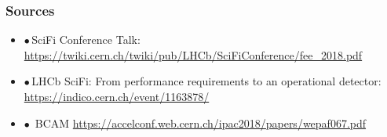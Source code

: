 \documentclass[aspectratio=1610, 12pt]{beamer}
\begin{document}
\begin{frame}\frametitle{Sources}
  \begin{itemize}
    \item $\bullet$\,SciFi Conference Talk: \url{https://twiki.cern.ch/twiki/pub/LHCb/SciFiConference/fee_2018.pdf}
    \item $\bullet$\,LHCb SciFi: From performance requirements to an operational detector: \url{https://indico.cern.ch/event/1163878/}
    \item $\bullet$\, BCAM \url{https://accelconf.web.cern.ch/ipac2018/papers/wepaf067.pdf}
  \end{itemize}
\end{frame}
\end{document}
